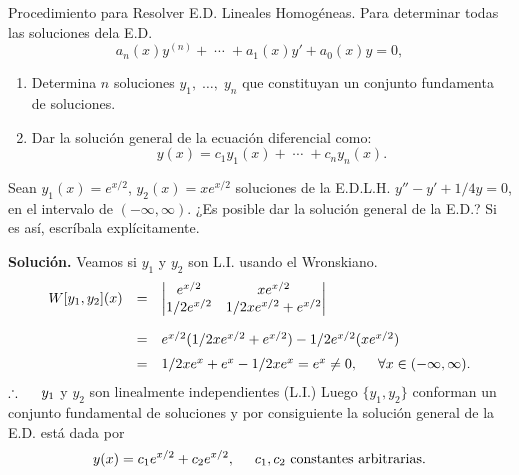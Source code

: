 \documentclass{beamer}
\begin{document}
\begin{frame}[t]
	\begin{block}{Procedimiento para Resolver E.D. Lineales Homogéneas.}
		Para determinar todas las soluciones dela E.D.
		\[
			a_n(x) y^{(n)} + \;\cdots\; + a_1(x) y' +a_0(x) y =0,
		\]
		\vspace{-6mm}
		\begin{enumerate}
			\item Determina \(n\) soluciones \(y_1, \;\ldots,\; y_n\) que constituyan un conjunto fundamenta de soluciones.
			\item Dar la solución general de la ecuación diferencial como:
			\[
				y(x) = c_1y_1(x) + \;\cdots\; +c_ny_n(x).
			\]
		\end{enumerate}
	\end{block}
	\begin{example}
		Sean \(y_1(x) = e^{x/2}\), \(y_2(x) = xe^{x/2}\) soluciones de la E.D.L.H. \(y'' -y' +1/4y=0\),  en el intervalo de \((- \infty , \infty)\). ¿Es posible dar la solución general de la E.D.? Si es así, escríbala explícitamente.
	\end{example}
\end{frame}

\begin{frame}[t]
	\begin{exampleblock}{}
		\textbf{Solución.} Veamos si \(y_1\) y \(y_2\) son L.I. usando el Wronskiano.
		\[
			\begin{array}{rcl}
				W[y_1,y_2] (x) & = & \begin{vmatrix}
					e^{x/2} & xe^{x/2} \\
					1/2e^{x/2} & 1/2xe^{x/2} +e^{x/2}
				\end{vmatrix}\\[6mm]
				& = & e^{x/2} (1/2xe^{x/2} +e^{x/2}) -1/2e^{x/2} (xe^{x/2}) \\[2mm]
				& = & 1/2xe^x+e^x-1/2xe^x = e^x \ne 0, \hspace{5mm} \forall x \in (- \infty , \infty) .
			\end{array}
		\]
		\(\therefore \hspace{5mm} y_1\) y \(y_2\) son linealmente independientes (L.I.) Luego \(\{y_1,y_2\}\) conforman un conjunto fundamental de soluciones y por consiguiente la solución general de la E.D. está dada por
		\[
			y(x) = c_1e^{x/2} + c_2e^{x/2} , \hspace{5mm} c_1,c_2 \mbox{ constantes arbitrarias.}
		\]
	\end{exampleblock}
\end{frame}
\end{document}
